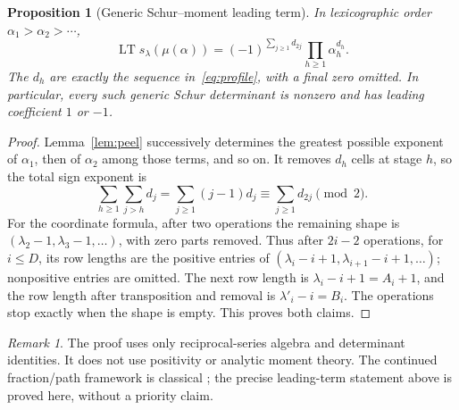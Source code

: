 \documentclass[11pt]{article}
\newtheorem{proposition}[theorem]{Proposition}
\theoremstyle{definition}
\theoremstyle{remark}
\newtheorem{remark}[theorem]{Remark}
\newcommand{\LT}{\operatorname{LT}}
\begin{document}
\begin{proposition}[Generic Schur--moment leading term]\label{prop:generic}
In lexicographic order $\alpha_1>\alpha_2>\cdots$,
\begin{equation}\label{eq:generic}
 \LT s_\lambda(\mu(\alpha))
 =(-1)^{\sum_{j\ge1}d_{2j}}
   \prod_{h\ge1}\alpha_h^{d_h}.
\end{equation}
The $d_h$ are exactly the sequence in~\eqref{eq:profile}, with a final zero
omitted. In particular, every such generic Schur determinant is nonzero
and has leading coefficient $1$ or $-1$.
\end{proposition}
\begin{proof}
Lemma~\ref{lem:peel} successively determines the greatest possible exponent
of $\alpha_1$, then of $\alpha_2$ among those terms, and so on. It removes
$d_h$ cells at stage $h$, so the total sign exponent is
\[
 \sum_{h\ge1}\sum_{j>h}d_j
 =\sum_{j\ge1}(j-1)d_j
 \equiv\sum_{j\ge1}d_{2j}\pmod2.
\]
For the coordinate formula, after two operations the remaining shape is
$(\lambda_2-1,\lambda_3-1,\ldots)$, with zero parts removed. Thus after
$2i-2$ operations, for $i\le D$, its row lengths are the positive entries of
$(\lambda_i-i+1,\lambda_{i+1}-i+1,\ldots)$; nonpositive entries are omitted.
The next row length is $\lambda_i-i+1=A_i+1$, and the row length after
transposition and removal is $\lambda'_i-i=B_i$. The operations stop
exactly when the shape is empty. This proves both claims.
\end{proof}

\begin{remark}
The proof uses only reciprocal-series algebra and determinant identities.
It does not use positivity or analytic moment theory. The continued
fraction/path framework is classical \cite{Flajolet,Sokal}; the precise
leading-term statement above is proved here, without a priority claim.
\end{remark}
\end{document}
